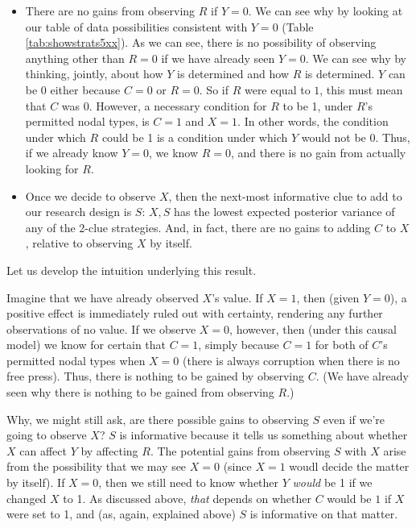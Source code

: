 \documentclass[
  12pt,
]{book}
\begin{document}
\begin{itemize}
\item
  There are no gains from observing \(R\) if \(Y=0\). We can see why by looking at our table of data possibilities consistent with \(Y=0\) (Table \ref{tab:showstrats5xx}). As we can see, there is no possibility of observing anything other than \(R=0\) if we have already seen \(Y=0\). We can see why by thinking, jointly, about how \(Y\) is determined and how \(R\) is determined. \(Y\) can be 0 either because \(C=0\) or \(R=0\). So if \(R\) were equal to \(1\), this must mean that \(C\) was \(0\). However, a necessary condition for \(R\) to be 1, under \(R\)'s permitted nodal types, is \(C=1\) and \(X=1\). In other words, the condition under which \(R\) could be 1 is a condition under which \(Y\) would not be 0. Thus, if we already know \(Y=0\), we know \(R=0\), and there is no gain from actually looking for \(R\).
\item
  Once we decide to observe \(X\), then the next-most informative clue to add to our research design is \(S\): \(X, S\) has the lowest expected posterior variance of any of the 2-clue strategies. And, in fact, there are no gains to adding \(C\) to \(X\), relative to observing \(X\) by itself.
\end{itemize}

Let us develop the intuition underlying this result.

Imagine that we have already observed \(X\)'s value. If \(X=1\), then (given \(Y=0\)), a positive effect is immediately ruled out with certainty, rendering any further observations of no value. If we observe \(X=0\), however, then (under this causal model) we know for certain that \(C=1\), simply because \(C=1\) for both of \(C\)'s permitted nodal types when \(X=0\) (there is always corruption when there is no free press). Thus, there is nothing to be gained by observing \(C\). (We have already seen why there is nothing to be gained from observing \(R\).)

Why, we might still ask, are there possible gains to observing \(S\) even if we're going to observe \(X\)? \(S\) is informative because it tells us something about whether \(X\) can affect \(Y\) by affecting \(R\). The potential gains from observing \(S\) with \(X\) arise from the possibility that we may see \(X=0\) (since \(X=1\) woudl decide the matter by itself). If \(X=0\), then we still need to know whether \(Y\) \emph{would} be 1 if we changed \(X\) to 1. As discussed above, \emph{that} depends on whether \(C\) would be \(1\) if \(X\) were set to 1, and (as, again, explained above) \(S\) is informative on that matter.
\end{document}
